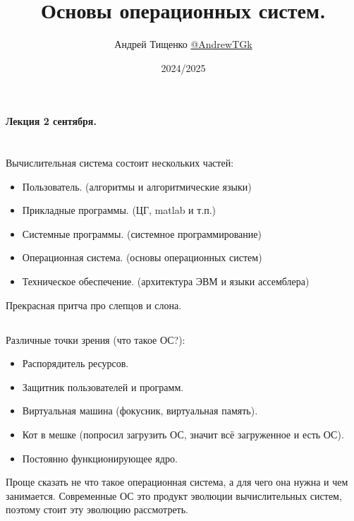 \documentclass[12pt, a4paper]{article}
\title{Основы операционных систем.}
\author{Андрей Тищенко \href{https://t.me/AndrewTGk}{@AndrewTGk}}
\date{2024/2025}
\begin{document}
    \maketitle
    \tableofcontents
    \begin{center}
        \textbf{Лекция 2 сентября.}
    \end{center}
    \section{}
    Вычислительная система состоит нескольких частей:
    \begin{itemize}
        \item Пользователь. (алгоритмы и алгоритмические языки)
        \item Прикладные программы. (ЦГ, matlab и т.п.)
        \item Системные программы. (системное программирование)
        \item Операционная система. (основы операционных систем)
        \item Техническое обеспечение. (архитектура ЭВМ и языки ассемблера)
    \end{itemize}
    Прекрасная притча про слепцов и слона.
    \subsection{}
    Различные точки зрения (что такое ОС?):
    \begin{itemize}
        \item Распорядитель ресурсов.
        \item Защитник пользователей и программ.
        \item Виртуальная машина (фокусник, виртуальная память).
        \item Кот в мешке (попросил загрузить ОС, значит всё загруженное и есть ОС).
        \item Постоянно функционирующее ядро.
    \end{itemize}
    Проще сказать не что такое операционная система, а для чего она нужна и чем 
    занимается. Современные ОС это продукт эволюции вычислительных систем, поэтому 
    стоит эту эволюцию рассмотреть.
\end{document}
